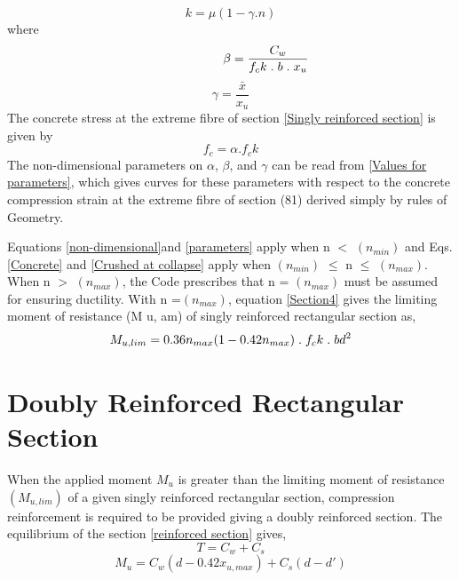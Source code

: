 \begin{equation}
k=\mu(1-\gamma.n)
\label{parameters}
\end{equation}
where
\begin{equation}
\hspace{2cm} \beta = \frac{C_w}{f_ck\hspace{0.1cm}.\hspace{0.1cm}b\hspace{0.1cm}.\hspace{0.1cm}x_u}
\label{Beta value}
\end{equation}
\begin{equation}
\gamma = \frac{\bar{x}}{x_u}
\label{stress}
\end{equation}
The concrete stress at the extreme ﬁbre of section \fig \ref{Singly reinforced section} is given by
\begin{equation}
f_c = \alpha.f_ck
\label{extreme fibre section}
\end{equation}
The non-dimensional parameters on $\alpha$, $\beta$, and $\gamma$ can be read from \fig \ref{Values for parameters}, which gives curves for
these parameters with respect to the concrete compression strain at the extreme ﬁbre of section
(81) derived simply by rules of Geometry.


Equations \eqn \ref{non-dimensional}and \eqn \ref{parameters} apply when n $<$ $(n_{min})$ and Eqs. \eqn \ref{Concrete} and \eqn \ref{Crushed at collapse} apply when $(n_{min})$ ${\leq}$ n ${\leq}$ $(n_{max})$.
When n $>$ $(n_{max})$, the Code prescribes that n = $(n_{max})$ must be assumed for
ensuring ductility. With n =$(n_{max})$, equation \eqn \ref{Section4} gives the limiting moment of resistance
(M u, am) of singly reinforced rectangular section as,
\begin{equation}
M_{u,lim} = 0.36 n_{max}(1-0.42n_{max})\hspace{0.1cm}.\hspace{0.1cm}f_ck\hspace{0.1cm}.\hspace{0.1cm}bd^2
\label{Singly R Section}
\end{equation}
\section{Doubly Reinforced Rectangular Section}
When the applied moment $M_u$ is greater than the limiting moment of resistance $(M_{u,lim})$
of a given singly reinforced rectangular section, compression reinforcement is required to be
provided giving a doubly reinforced section. The equilibrium of the section \fig \ref{reinforced section} gives,
\begin{equation}
T = C_w + C_s
\label{Equillibrium of section}
\end{equation}
\begin{equation}
M_u = C_w(d-0.42x_{u,max}) + C_s(d-d ')
\label{EOSII}
\end{equation}

